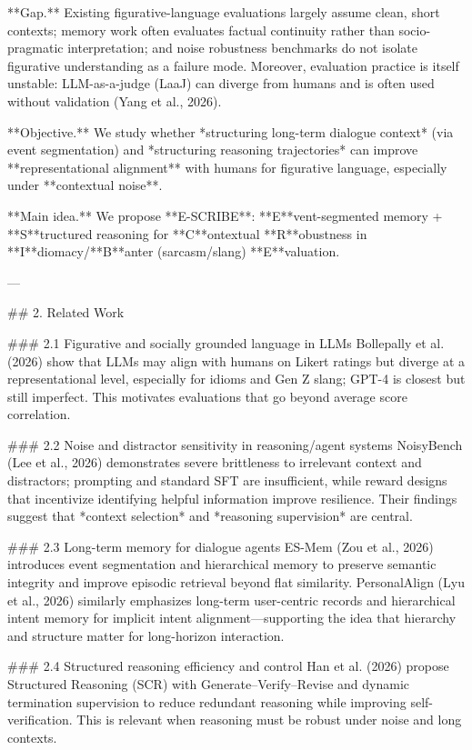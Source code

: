 **Gap.** Existing figurative-language evaluations largely assume clean, short contexts; memory work often evaluates factual continuity rather than socio-pragmatic interpretation; and noise robustness benchmarks do not isolate figurative understanding as a failure mode. Moreover, evaluation practice is itself unstable: LLM-as-a-judge (LaaJ) can diverge from humans and is often used without validation (Yang et al., 2026).

**Objective.** We study whether *structuring long-term dialogue context* (via event segmentation) and *structuring reasoning trajectories* can improve **representational alignment** with humans for figurative language, especially under **contextual noise**.

**Main idea.** We propose **E-SCRIBE**: **E**vent-segmented memory + **S**tructured reasoning for **C**ontextual **R**obustness in **I**diomacy/**B**anter (sarcasm/slang) **E**valuation.

---

## 2. Related Work  

### 2.1 Figurative and socially grounded language in LLMs  
Bollepally et al. (2026) show that LLMs may align with humans on Likert ratings but diverge at a representational level, especially for idioms and Gen Z slang; GPT-4 is closest but still imperfect. This motivates evaluations that go beyond average score correlation.

### 2.2 Noise and distractor sensitivity in reasoning/agent systems  
NoisyBench (Lee et al., 2026) demonstrates severe brittleness to irrelevant context and distractors; prompting and standard SFT are insufficient, while reward designs that incentivize identifying helpful information improve resilience. Their findings suggest that *context selection* and *reasoning supervision* are central.

### 2.3 Long-term memory for dialogue agents  
ES-Mem (Zou et al., 2026) introduces event segmentation and hierarchical memory to preserve semantic integrity and improve episodic retrieval beyond flat similarity. PersonalAlign (Lyu et al., 2026) similarly emphasizes long-term user-centric records and hierarchical intent memory for implicit intent alignment—supporting the idea that hierarchy and structure matter for long-horizon interaction.

### 2.4 Structured reasoning efficiency and control  
Han et al. (2026) propose Structured Reasoning (SCR) with Generate–Verify–Revise and dynamic termination supervision to reduce redundant reasoning while improving self-verification. This is relevant when reasoning must be robust under noise and long contexts.

